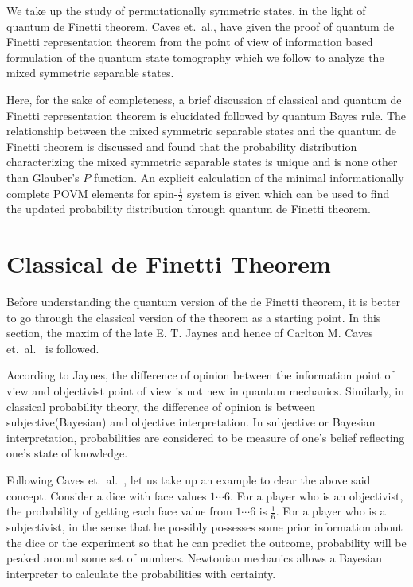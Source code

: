 We take up the study of permutationally symmetric states, in the light of quantum de Finetti theorem. Caves \cite{chap27-key8} et.\ al., have given the proof of quantum de Finetti representation theorem from the point of view of information based formulation of the quantum state tomography which we follow to analyze the mixed symmetric separable states. 

Here, for the sake of completeness, a brief discussion of classical and quantum de Finetti representation theorem is elucidated followed by quantum Bayes rule. The relationship between the mixed symmetric separable states and the quantum de Finetti theorem is discussed and found that the probability distribution characterizing the mixed symmetric separable states is unique and is none other than Glauber's $P$ function. An explicit calculation of the minimal informationally complete POVM elements for spin-$\frac{1}{2}$ system is given which can be used to find the updated probability distribution through quantum de Finetti theorem.

\section{Classical de Finetti Theorem}\label{chap27-sec2}

Before understanding the quantum version of the de Finetti theorem, it is better to go through the classical version of the theorem as a starting point. In this section, the maxim of the late E. T. Jaynes \cite{chap27-key9} and hence of Carlton M. Caves et.\ al.\ \cite{chap27-key8} is followed.

According to Jaynes, the difference of opinion between the information point of view and objectivist point of view is not new in quantum mechanics. Similarly, in classical probability theory, the difference of opinion is between subjective(Bayesian) and objective interpretation. In subjective or Bayesian interpretation, probabilities are considered to be measure of one's belief reflecting one's state of knowledge.

Following Caves et.\ al.\ \cite{chap27-key8}, let us take up an example to clear the above said concept. Consider a dice with face values $1 \cdots 6$. For a player who is an objectivist, the probability of getting each face value from $1 \cdots 6$ is $\frac{1}{6}$. For a player who is a subjectivist, in the sense that he possibly possesses some prior information about the dice or the experiment so that he can predict the outcome, probability will be peaked around some set of numbers. Newtonian mechanics allows a Bayesian interpreter to calculate the probabilities with certainty.

